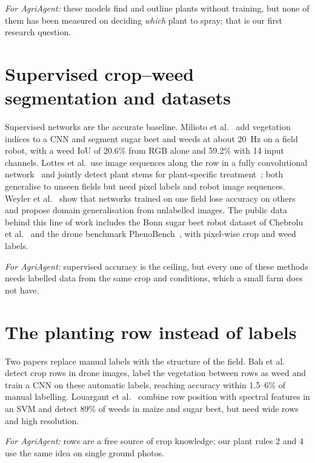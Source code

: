 \textit{For AgriAgent:} these models find and outline plants without training, but none of them has
been measured on deciding \emph{which} plant to spray; that is our first research question.

\section{Supervised crop--weed segmentation and datasets}\label{sec:lit-supervised}
Supervised networks are the accurate baseline. Milioto et al.~\cite{milioto2018realtime} add vegetation
indices to a CNN and segment sugar beet and weeds at about 20~Hz on a field robot, with a weed IoU of
20.6\% from RGB alone and 59.2\% with 14 input channels. Lottes et al.\ use image sequences along the
row in a fully convolutional network~\cite{lottes2018fcn} and jointly detect plant stems for
plant-specific treatment~\cite{lottes2020stem}; both generalise to unseen fields but need pixel labels
and robot image sequences. Weyler et al.~\cite{weyler2023domain} show that networks trained on one field
lose accuracy on others and propose domain generalisation from unlabelled images. The public data
behind this line of work includes the Bonn sugar beet robot dataset of Chebrolu et
al.~\cite{chebrolu2017sugarbeet} and the drone benchmark PhenoBench~\cite{weyler2024phenobench}, with
pixel-wise crop and weed labels.

\textit{For AgriAgent:} supervised accuracy is the ceiling, but every one of these methods needs
labelled data from the same crop and conditions, which a small farm does not have.

\section{The planting row instead of labels}\label{sec:lit-rows}
Two papers replace manual labels with the structure of the field. Bah et al.~\cite{bah2018unsupervised}
detect crop rows in drone images, label the vegetation between rows as weed and train a CNN on these
automatic labels, reaching accuracy within 1.5--6\% of manual labelling. Louargant et
al.~\cite{louargant2018rowcrops} combine row position with spectral features in an SVM and detect 89\%
of weeds in maize and sugar beet, but need wide rows and high resolution.

\textit{For AgriAgent:} rows are a free source of crop knowledge; our plant rules 2 and 4 use the same
idea on single ground photos.

